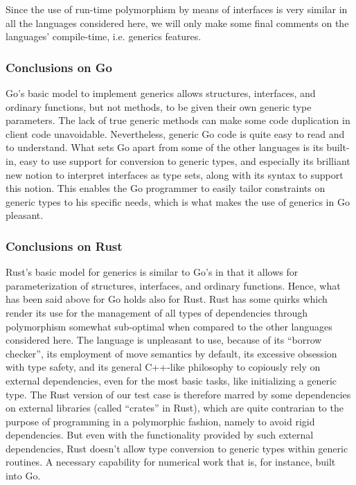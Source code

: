 \documentclass[11pt,oneside]{article}
\begin{document}
Since the use of run-time polymorphism by means of interfaces is very
similar in all the languages considered here, we will only make some final
comments on the languages' compile-time, i.e.  generics features.

\subsubsection{Conclusions on Go}

Go's basic model to implement generics allows structures, interfaces,
and ordinary functions, but not methods, to be given their own generic
type parameters. The lack of true generic methods can make some code
duplication in client code unavoidable. Nevertheless, generic Go code
is quite easy to read and to understand. What sets Go apart from some
of the other languages is its built-in, easy to use support for
conversion to generic types, and especially its brilliant new notion
to interpret interfaces as type sets, along with its syntax to support
this notion. This enables the Go programmer to easily tailor
constraints on generic types to his specific needs, which is what
makes the use of generics in Go pleasant.

\subsubsection{Conclusions on Rust}

Rust's basic model for generics is similar to Go's in that it
allows for parameterization of structures, interfaces, and ordinary
functions. Hence, what has been said above for Go holds also for Rust.
Rust has some quirks which render its use for the management of all
types of dependencies through polymorphism somewhat sub-optimal when
compared to the other languages considered here. The language is
unpleasant to use, because of its ``borrow checker'', its employment
of move semantics by default, its excessive obsession with type
safety, and its general C++-like philosophy to copiously rely on
external dependencies, even for the most basic tasks, like
initializing a generic type. The Rust version of our test case is
therefore marred by some dependencies on external libraries (called
``crates'' in Rust), which are quite contrarian to the purpose of
programming in a polymorphic fashion, namely to avoid rigid
dependencies. But even with the functionality provided by such
external dependencies, Rust doesn't allow type conversion to generic
types within generic routines. A necessary capability for numerical
work that is, for instance, built into Go.
\end{document}
